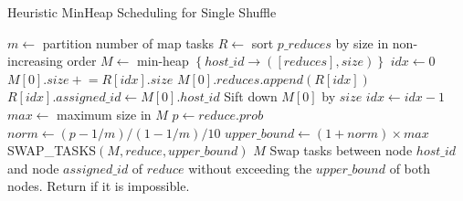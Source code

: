 \begin{minipage}{0.95\columnwidth}
\begin{algorithm}[H]
\caption{Heuristic MinHeap Scheduling for Single Shuffle}
\label{hminheap}
	\begin{algorithmic}[1]
	\small
		\State $m\gets$ partition number of map tasks
		\State $R\gets$ sort $p\_reduces$ by size in non-increasing order
		\State $M\gets$ min-heap $\left\{ host\_id \rightarrow \left( \left[ reduces \right], size \right) \right\}$
		\State $idx\gets 0$
		\State $M\left[0\right].size \mathrel{+}= R\left[idx\right].size$
		\State $M\left[0\right].reduces.append\left(R\left[idx\right]\right)$
		\State $R\left[idx\right].assigned\_id \gets M \left[0\right].host\_id$
		\State Sift down $M\left[0\right]$ by $size$
		\State $idx\gets idx-1$
		\EndWhile
		\State $max\gets$ maximum size in $M$
				\State $p\gets reduce.prob$
				\State $norm\gets \left(p-1/m\right)/\left(1-1/m\right)/10$
				\State $upper\_bound \gets \left(1 + norm\right) \times max$
				\State SWAP\_TASKS$\left(M, reduce, upper\_bound\right)$
			\EndIf
		\EndFor
		\Return $M$
	\EndProcedure
		\State Swap tasks between node $host\_id$ and node $assigned\_id$
		\State of $reduce$ without exceeding the $upper\_bound$
		\State of both nodes.
		\State Return if it is impossible.
	\EndProcedure
	\end{algorithmic}
\end{algorithm}
\end{minipage}

